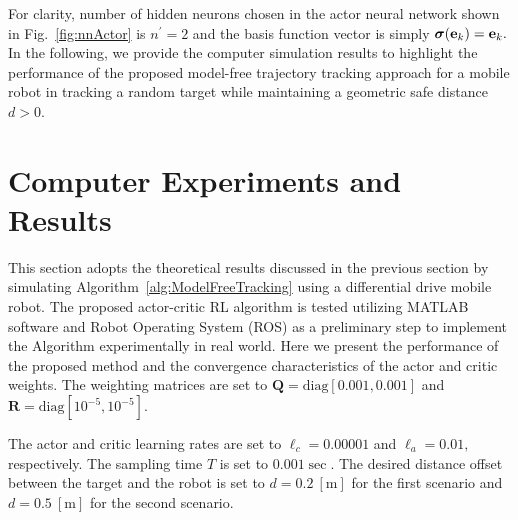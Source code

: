 \documentclass[conference]{IEEEtran}
\begin{document}
For clarity, number of hidden neurons chosen in the actor neural network shown in Fig.~\ref{fig:nnActor} is $n^{'} = 2$ and the basis function vector is simply $\bm{\sigma}({\bf e}_k) = {\bf e}_k.$ In the following, we provide the computer simulation results to highlight the performance of the proposed model-free trajectory tracking approach for a mobile robot in tracking a random target while maintaining a geometric safe distance $d>0.$  
    


  

 \section{Computer Experiments and Results}
 \label{sec:resultsExperiments}

 This section adopts the theoretical results discussed in the previous section by simulating Algorithm~\ref{alg:ModelFreeTracking} using a differential drive mobile robot. The proposed actor-critic RL algorithm is tested  utilizing MATLAB software and Robot Operating System (ROS)  as a preliminary step to implement the Algorithm experimentally in real world. Here we present the performance of the proposed method and the convergence characteristics of the actor and critic weights. The weighting matrices are set to $\mathbf{Q} = \mathrm{diag}[0.001,0.001]$ and $\mathbf{R} = \mathrm{diag}[10^{-5}, 10^{-5}].$ %
  
  
 The actor and critic learning rates are set to $\ell_c = 0.00001$ and $\ell_a=0.01,$ respectively. The sampling time $T$ is set to $0.001 \sec.$ The desired distance offset between the target and the robot is set to $ d = 0.2~[\si{\meter}]$ for the first scenario and $d = 0.5~[\si{\meter}]$ for the second scenario. 
\end{document}
